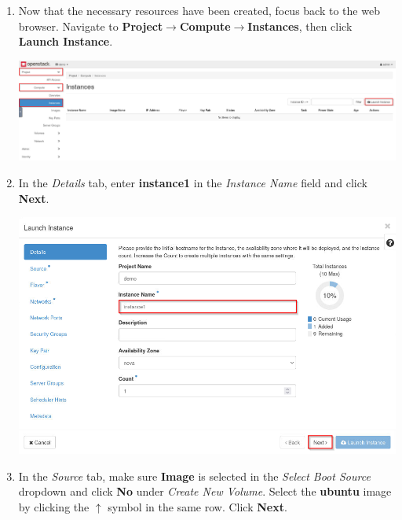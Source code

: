 \documentclass[letterpaper, 12pt]{article}
\begin{document}
\begin{enumerate}
    \item Now that the necessary resources have been created, focus back to the web browser. Navigate to
    \textbf{Project$\rightarrow$Compute$\rightarrow$Instances}, then click \textbf{Launch Instance}.

    \begin{center}
        \includegraphics[width=\linewidth]{images/part1/step18.png}
    \end{center}

    \item In the \textit{Details} tab, enter \textbf{instance1} in the \textit{Instance Name} field and click
    \textbf{Next}.

    \begin{center}
        \includegraphics[width=\linewidth]{images/part1/step19.png}
    \end{center}

    \item In the \textit{Source} tab, make sure \textbf{Image} is selected in the \textit{Select Boot Source} dropdown
    and click \textbf{No} under \textit{Create New Volume}. Select the \textbf{ubuntu} image by clicking the $\uparrow$
    symbol in the same row. Click \textbf{Next}.


\end{enumerate}
\end{document}
